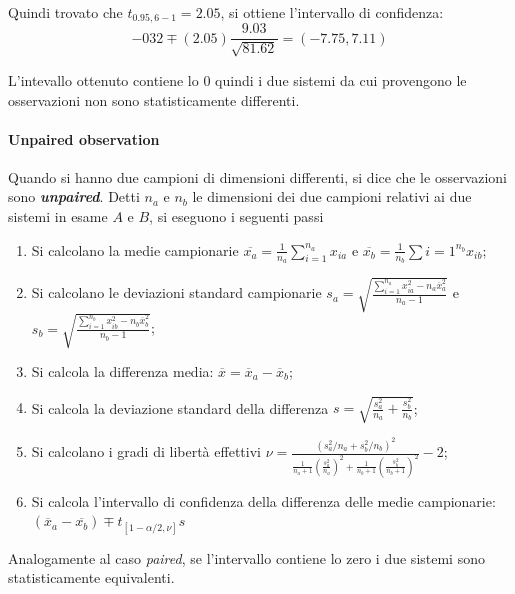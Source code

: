 \documentclass{article}
\begin{document}
Quindi trovato che $t_{0.95, 6-1} = 2.05$, si ottiene l'intervallo di confidenza:
\[
  -032 \mp (2.05)\frac{9.03}{\sqrt{81.62}} = (-7.75, 7.11)
\]

L'intevallo ottenuto contiene lo $0$ quindi i due sistemi da cui provengono le osservazioni
non sono statisticamente differenti.

\paragraph{Unpaired observation}Quando si hanno due campioni di dimensioni differenti, si 
dice che le osservazioni sono \textbf{\textit{unpaired}}. Detti $n_a$ e $n_b$ le dimensioni 
dei due campioni relativi ai due sistemi in esame $A$ e $B$, si eseguono i seguenti passi

\begin{enumerate}[label=(\alph*)] 
  \item Si calcolano la medie campionarie $\overline{x_a} = \frac{1}{n_a}\sum_{i=1}^{n_a}x_{ia}$ 
    e $\overline{x_b} = \frac{1}{n_b}\sum{i=1}^{n_b}x_{ib}$;
  \item Si calcolano le deviazioni standard campionarie 
    $s_a = \sqrt{\frac{\sum_{i=1}^{n_a}x_{ia}^2 - n_a\overline{x}^2_a}{n_a - 1}}$ e 
    $s_b = \sqrt{\frac{\sum_{i=1}^{n_b}x_{ib}^2 - n_b\overline{x}^2_b}{n_b- 1}}$;
  \item Si calcola la differenza media: $\overline{x} = \overline{x}_a - \overline{x}_b$;
  \item Si calcola la deviazione standard della differenza $s = \sqrt{\frac{s_a^2}{n_a} + 
    \frac{s_b^2}{n_b}}$;
  \item Si calcolano i gradi di libertà effettivi $\nu = \frac{(s_a^2/n_a + s_b^2/n_b)^2}
    {\frac{1}{n_a+1}(\frac{s_a^2}{n_a})^2 + \frac{1}{n_b + 1} (\frac{s_b^2}{n_b+1})^2 } - 2$;
  \item Si calcola l'intervallo di confidenza della differenza delle medie campionarie:
    $(\overline{x}_a - \overline{x_b}) \mp t_{[1-\alpha/2, \nu]} s$
\end{enumerate}

Analogamente al caso \textit{paired}, se l'intervallo contiene lo zero i due sistemi sono 
statisticamente equivalenti.
\end{document}
